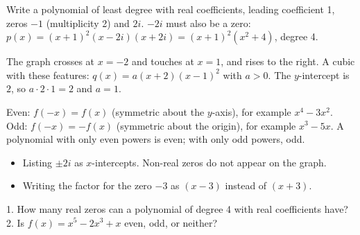 \begin{example}
Write a polynomial of least degree with real coefficients, leading coefficient 1, zeros $-1$ (multiplicity 2) and $2i$.
\sol $-2i$ must also be a zero: $p(x)=(x+1)^2(x-2i)(x+2i)=(x+1)^2(x^2+4)$, degree 4.
\end{example}

\begin{example}
\begin{center}
\end{center}
\sol The graph crosses at $x=-2$ and touches at $x=1$, and rises to the right. A cubic with these features: $q(x)=a(x+2)(x-1)^2$ with $a>0$. The $y$-intercept is $2$, so $a\cdot2\cdot1=2$ and $a=1$.
\end{example}

\begin{keyidea}
Even: $f(-x)=f(x)$ (symmetric about the $y$-axis), for example $x^4-3x^2$. Odd: $f(-x)=-f(x)$ (symmetric about the origin), for example $x^3-5x$. A polynomial with only even powers is even; with only odd powers, odd.
\end{keyidea}

\begin{mistakes}
\begin{itemize}
\item Listing $\pm2i$ as $x$-intercepts. Non-real zeros do not appear on the graph.
\item Writing the factor for the zero $-3$ as $(x-3)$ instead of $(x+3)$.
\end{itemize}
\end{mistakes}

\begin{quickcheck}
1. How many real zeros can a polynomial of degree 4 with real coefficients have?\\
2. Is $f(x)=x^5-2x^3+x$ even, odd, or neither?
\end{quickcheck}


